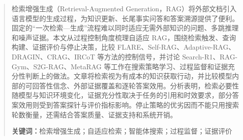 \begin{abstract}
检索增强生成（Retrieval-Augmented Generation，RAG）将外部文档引入语言模型的生成过程，为知识更新、长尾事实问答和答案溯源提供了便利。固定的“一次检索—生成”流程难以同时适应无需外部知识的问题、多跳推理和噪声证据。本文从过程控制角度梳理自适应 RAG，围绕检索触发、查询构建、证据评价与停止决策，比较 FLARE、Self-RAG、Adaptive-RAG、DRAGIN、CRAG、IRCoT 等方法的控制信号，并讨论 Search-R1、RAG-Gym、S2G-RAG、MetaRAG 等工作在搜索策略学习、过程监督和证据充分性判断上的做法。文章将检索视为有成本的知识获取行动，并比较模型内部的可回答性信念、外部证据覆盖和逐轮答案效用。分析表明，检索必要性随模型与知识环境变化，证据充分性取决于任务的引用和时效要求，部分答案效用则受到答案探针与评价指标影响。停止策略的优劣因而不能只用搜索轮数衡量，还需结合答案质量、证据支持和系统开销。

\noindent\textbf{关键词：}检索增强生成；自适应检索；智能体搜索；过程监督；证据评价
\end{abstract}
